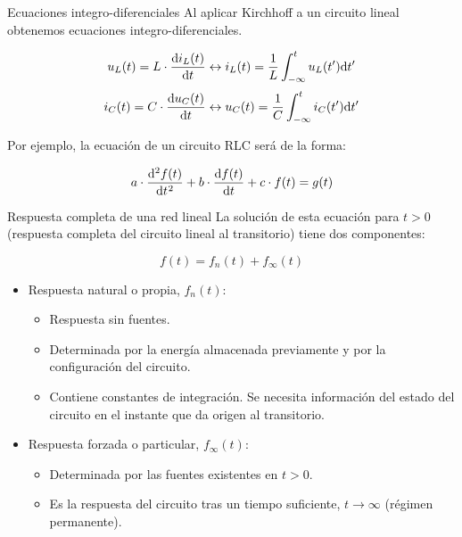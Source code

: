 \documentclass[aspectratio=169, usenames,svgnames,dvipsnames]{beamer}
\begin{document}
\begin{frame}[label={sec:orgb818ff7}]{Ecuaciones integro-diferenciales}
Al aplicar Kirchhoff a un circuito lineal obtenemos ecuaciones integro-diferenciales. 

\[
  u_L(t) = L \cdot \diff{i_L(t)}{t}
  \leftrightarrow
  i_L(t) = \frac{1}{L} \int^t_{-\infty}u_L(t') \mathrm{d}t'
\]
\[
  i_C(t) = C \cdot \diff{u_C(t)}{t}
  \leftrightarrow
  u_C(t) = \frac{1}{C} \int^t_{-\infty}i_C(t') \mathrm{d}t'
\]

Por ejemplo, la ecuación de un circuito RLC será de la forma:

\[
  a \cdot \diff[2]{f(t)}{t} + b \cdot \diff{f(t)}{t} + c \cdot f(t) = g(t)
\]
\end{frame}
\begin{frame}[label={sec:org66c19da}]{Respuesta completa de una red lineal}
La solución de esta ecuación para \(t > 0\) (respuesta completa del circuito lineal al transitorio) tiene dos componentes:

\[
 \boxed{f(t) = f_n(t) + f_\infty(t) }
 \]

\begin{itemize}
\item Respuesta \alert{natural} o propia, \(f_n(t)\):
\begin{itemize}
\item Respuesta sin fuentes.
\item Determinada por la energía almacenada previamente y por la configuración del circuito.
\item Contiene constantes de integración. Se necesita información del estado del circuito en el instante que da origen al transitorio.
\end{itemize}
\item Respuesta \alert{forzada} o particular, \(f_\infty(t)\):
\begin{itemize}
\item Determinada por las fuentes existentes en \(t > 0\).
\item Es la respuesta del circuito tras un tiempo suficiente, \(t \to \infty\) (régimen permanente).
\end{itemize}
\end{itemize}
\end{frame}
\end{document}
